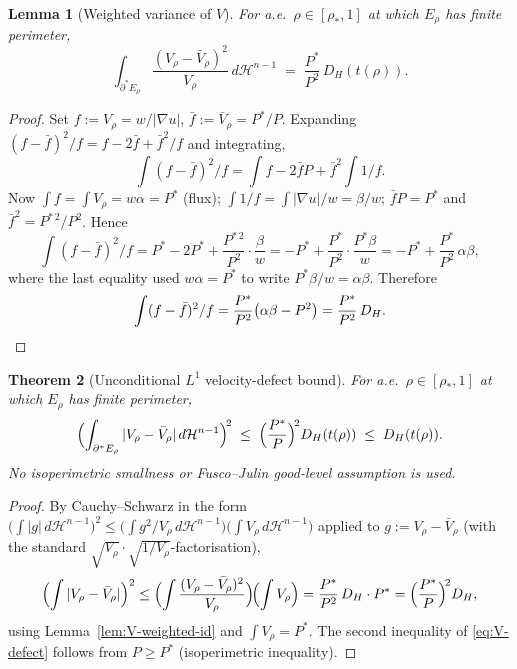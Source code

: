 \documentclass[11pt]{article}
\newtheorem{theorem}{Theorem}[section]
\newtheorem{lemma}[theorem]{Lemma}
\theoremstyle{definition}
\newcommand{\rstar}{\rho_{*}}
\newcommand{\Hn}{\mathcal H^{n-1}}
\begin{document}
\begin{lemma}[Weighted variance of $V$]\label{lem:V-weighted-var}
For a.e.\ $\rho\in[\rstar,1]$ at which $E_\rho$ has finite perimeter,
\begin{equation}\label{eq:V-weighted-id}
   \int_{\partial^{*}E_\rho}\frac{(V_\rho-\bar V_\rho)^{2}}{V_\rho}\,d\Hn
   \;=\;\frac{P^{*}}{P^{2}}\,D_H(t(\rho)).
\end{equation}
\end{lemma}

\begin{proof}
Set $f:=V_\rho=w/|\nabla u|$, $\bar f:=\bar V_\rho=P^{*}/P$.
Expanding $(f-\bar f)^{2}/f=f-2\bar f+\bar f^{2}/f$ and integrating,
\[
   \int(f-\bar f)^{2}/f
   =\int f-2\bar f P+\bar f^{2}\!\int 1/f.
\]
Now $\int f=\int V_\rho=w\alpha=P^{*}$ (flux);
$\int 1/f=\int|\nabla u|/w=\beta/w$;
$\bar f P=P^{*}$ and $\bar f^{2}=P^{*\,2}/P^{2}$.  Hence
\[
   \int(f-\bar f)^{2}/f
   =P^{*}-2P^{*}+\frac{P^{*\,2}}{P^{2}}\cdot\frac{\beta}{w}
   =-P^{*}+\frac{P^{*}}{P^{2}}\cdot\frac{P^{*}\beta}{w}
   =-P^{*}+\frac{P^{*}}{P^{2}}\,\alpha\beta,
\]
where the last equality used $w\alpha=P^{*}$ to write
$P^{*}\beta/w=\alpha\beta$.  Therefore
\[
   \int(f-\bar f)^{2}/f
   =\frac{P^{*}}{P^{2}}\bigl(\alpha\beta-P^{2}\bigr)
   =\frac{P^{*}}{P^{2}}\,D_H.\qedhere
\]
\end{proof}

\begin{theorem}[Unconditional $L^{1}$ velocity-defect bound]
\label{thm:V-defect}
For a.e.\ $\rho\in[\rstar,1]$ at which $E_\rho$ has finite perimeter,
\begin{equation}\label{eq:V-defect}
   \Bigl(\int_{\partial^{*}E_\rho}|V_\rho-\bar V_\rho|\,d\Hn\Bigr)^{\!2}
   \;\le\;\Bigl(\frac{P^{*}}{P}\Bigr)^{\!2}D_H(t(\rho))
   \;\le\;D_H(t(\rho)).
\end{equation}
No isoperimetric smallness or Fusco--Julin good-level assumption is
used.
\end{theorem}

\begin{proof}
By Cauchy--Schwarz in the form
$\bigl(\int|g|\,d\Hn\bigr)^{2}\le\bigl(\int g^{2}/V_\rho\,d\Hn\bigr)\bigl(\int V_\rho\,d\Hn\bigr)$
applied to $g:=V_\rho-\bar V_\rho$ (with the standard
$\sqrt{V_\rho}\cdot\sqrt{1/V_\rho}$-factorisation),
\[
   \Bigl(\int|V_\rho-\bar V_\rho|\Bigr)^{2}
   \le\Bigl(\int\frac{(V_\rho-\bar V_\rho)^{2}}{V_\rho}\Bigr)\!\Bigl(\int V_\rho\Bigr)
   =\frac{P^{*}}{P^{2}}\,D_H\cdot P^{*}
   =\Bigl(\frac{P^{*}}{P}\Bigr)^{\!2}D_H,
\]
using Lemma~\ref{lem:V-weighted-id} and $\int V_\rho=P^{*}$.  The
second inequality of \eqref{eq:V-defect} follows from
$P\ge P^{*}$ (isoperimetric inequality).
\end{proof}
\end{document}

